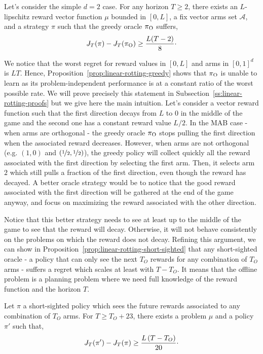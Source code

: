 \begin{proposition}
\label{prop:linear-rotting-greedy}
Let's consider the simple $d=2$ case. For any horizon $T\geq 2$, there exists an $L$-lipschitz reward vector function $\mu$ bounded in $[0,L]$, a fix vector arms set $\mathcal{A}$, and a strategy $\pi$ such that the greedy oracle $\pi_{\rm O}$ suffers,
\[
J_T(\pi) - J_T(\pi_{\rm O}) \geq \frac{L(T-2)}{8}\cdot 
\]
\end{proposition}

We notice that the worst regret for reward values in $[0,L]$ and arms in $[0,1]^d$ is $LT$. Hence, Proposition~\ref{prop:linear-rotting-greedy} shows that $\pi_{\rm O}$ is unable to learn as its problem-independent performance is at a constant ratio of the worst possible rate. We will prove precisely this statement in Subsection~\ref{ss:linear-rotting-proofs} but we give here the main intuition. Let's consider a vector reward function such that the first direction decays from $L$ to $0$ in the middle of the game and the second one has a constant reward value $L/2$. In the MAB case - when arms are orthogonal - the greedy oracle $\pi_{\rm O}$ stops pulling the first direction when the associated reward decreases. However, when arms are not orthogonal (e.g. $(1,0)$ and $(\nicefrac{1}{2}, \nicefrac{1}{2})$), the greedy policy will collect quickly all the reward associated with the first direction by selecting the first arm. Then, it selects arm $2$ which still pulls a fraction of the first direction, even though the reward has decayed. A better oracle strategy would be to notice that the good reward associated with the first direction will be gathered at the end of the game anyway, and focus on maximizing the reward associated with the other direction.

Notice that this better strategy needs to see at least up to the middle of the game to see that the reward will decay. Otherwise, it will not behave consistently on the problems on which the reward does not decay. Refining this argument, we can show in Proposition~\ref{prop:linear-rotting-short-sighted} that any short-sighted oracle - \ie a policy that can only see the next $T_O$ rewards for any combination of $T_O$ arms - suffers a regret which scales at least with $T-T_O$. It means that the offline problem is a planning problem where we need full knowledge of the reward function and the horizon $T$.

\begin{proposition}
\label{prop:linear-rotting-short-sighted}
Let $\pi$ a short-sighted policy which sees the future rewards associated to any combination of $T_O$ arms. For $T \geq T_O + 23$, there exists a problem $\mu$ and a policy $\pi'$ such that,
\[
J_T(\pi') - J_T(\pi) \geq \frac{L\left(T-T_O\right)}{20}\cdot
\]
\end{proposition}


